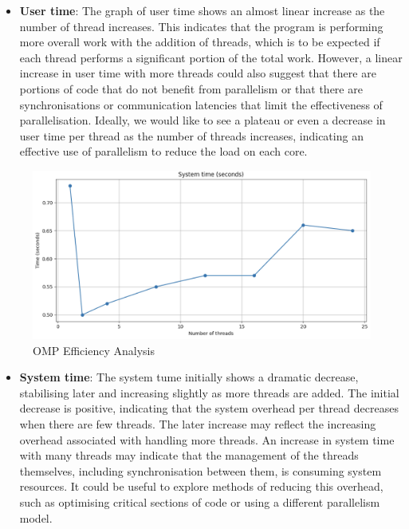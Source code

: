 \documentclass[
]{article}
\providecommand{\tightlist}{%
  \setlength{\itemsep}{0pt}\setlength{\parskip}{0pt}}
\begin{document}
\begin{itemize}
\tightlist
\item
  \textbf{User time}: The graph of user time shows an almost linear
  increase as the number of thread increases. This indicates that the
  program is performing more overall work with the addition of threads,
  which is to be expected if each thread performs a significant portion
  of the total work. However, a linear increase in user time with more
  threads could also suggest that there are portions of code that do not
  benefit from parallelism or that there are synchronisations or
  communication latencies that limit the effectiveness of
  parallelisation. Ideally, we would like to see a plateau or even a
  decrease in user time per thread as the number of threads increases,
  indicating an effective use of parallelism to reduce the load on each
  core.
\end{itemize}

\begin{figure}
\includegraphics[width=1\linewidth]{figures/eff_omp_2.png}
\caption{OMP Efficiency Analysis}
\label{}
\end{figure}

\begin{itemize}
\tightlist
\item
  \textbf{System time}: The system tume initially shows a dramatic
  decrease, stabilising later and increasing slightly as more threads
  are added. The initial decrease is positive, indicating that the
  system overhead per thread decreases when there are few threads. The
  later increase may reflect the increasing overhead associated with
  handling more threads. An increase in system time with many threads
  may indicate that the management of the threads themselves, including
  synchronisation between them, is consuming system resources. It could
  be useful to explore methods of reducing this overhead, such as
  optimising critical sections of code or using a different parallelism
  model.
\end{itemize}
\end{document}
